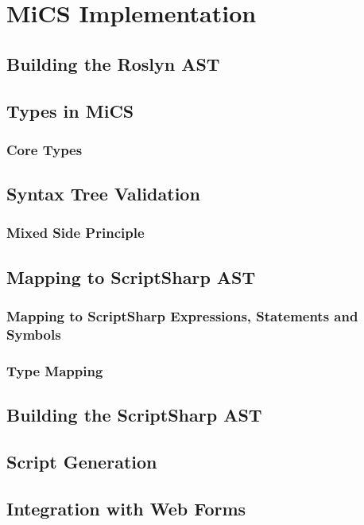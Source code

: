 \chapter{MiCS Implementation}

	\section{Building the Roslyn AST}

	\section{Types in MiCS}

		\subsection{Core Types}

	\section{Syntax Tree Validation}

		\subsection{Mixed Side Principle}

	\section{Mapping to ScriptSharp AST}

		\subsection{Mapping to ScriptSharp Expressions, Statements and Symbols}

		\subsection{Type Mapping}

	\section{Building the ScriptSharp AST}

	\section{Script Generation}

	\section{Integration with Web Forms}